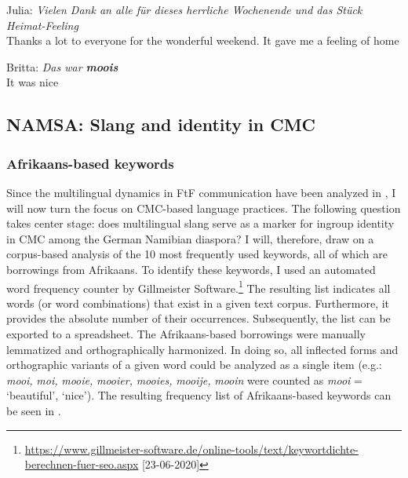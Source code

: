 \documentclass[output=paper]{langsci/langscibook}
\begin{document}
\ea\label{ex:radke:4}
	\ea Julia: \textit{Vielen Dank an alle für dieses herrliche Wochenende und das Stück Heimat-Feeling} \\
	
	Thanks a lot to everyone for the wonderful weekend. It gave me a feeling of home   

	\ex Britta: \textit{Das war \textbf{moois}}\\

	 It was nice
\z
\z
   
\subsection{NAMSA: Slang and identity in CMC} 
  \label{sec:radke:3.4}
  
  \subsubsection{Afrikaans-based keywords}
 \label{sec:radke:3.4.1}

Since the multilingual dynamics in FtF communication have been analyzed in , I will now turn the focus on CMC-based language practices. The following question takes center stage: does multilingual slang serve as a marker for ingroup identity in CMC among the German Namibian diaspora? I will, therefore, draw on a corpus-based analysis of the 10 most frequently used keywords, all of which are borrowings from Afrikaans. To identify these keywords, I used an automated word frequency counter by Gillmeister Software.\footnote{\url{https://www.gillmeister-software.de/online-tools/text/keywortdichte-berechnen-fuer-seo.aspx} [23-06-2020]} The resulting list indicates all words (or word combinations) that exist in a given text corpus. Furthermore, it provides the absolute number of their occurrences. Subsequently, the list can be exported to a spreadsheet. The Afrikaans-based borrowings were manually lemmatized and orthographically harmonized. In doing so, all inflected forms and orthographic variants of a given word could be analyzed as a single item (e.g.: \textit{mooi,} \textit{moi,} \textit{mooie,} \textit{mooier,} \textit{mooies,} \textit{mooije,} \textit{mooin} were counted as \textit{mooi} = ‘beautiful’, ‘nice’). The resulting frequency list of Afrikaans-based keywords can be seen in .



  
 
\end{document}
